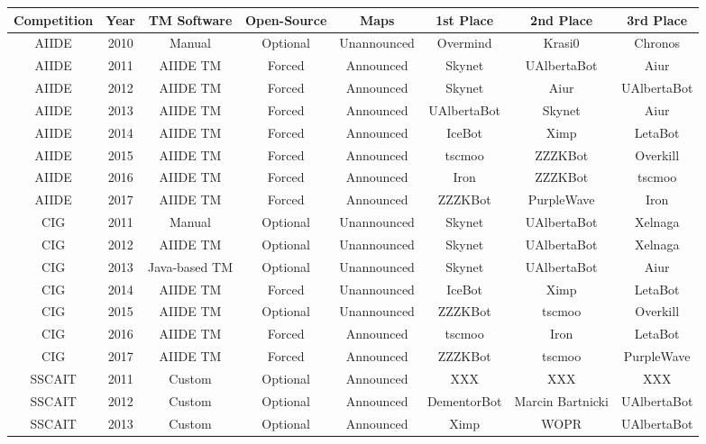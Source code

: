 
\begin{table}[t] 
 
 \begin{center}
 \begin{tabular} {| c | c | c c c | c c c |}
 \hline
 Competition & Year & TM Software & Open-Source & Maps & 1st Place & 2nd Place & 3rd Place\\
 \hline
 AIIDE & 2010 & Manual & Optional & Unannounced & Overmind & Krasi0 & Chronos \\
 \hline
 AIIDE & 2011 & AIIDE TM & Forced & Announced & Skynet & UAlbertaBot & Aiur \\
 \hline
 AIIDE & 2012 & AIIDE TM & Forced & Announced & Skynet & Aiur & UAlbertaBot\\
\hline
 AIIDE & 2013 & AIIDE TM & Forced & Announced & UAlbertaBot & Skynet & Aiur\\
\hline
 AIIDE & 2014 & AIIDE TM & Forced & Announced & IceBot & Ximp & LetaBot\\
\hline
 AIIDE & 2015 & AIIDE TM & Forced & Announced & tscmoo & ZZZKBot & Overkill\\
\hline
 AIIDE & 2016 & AIIDE TM & Forced & Announced & Iron & ZZZKBot & tscmoo\\
\hline
 AIIDE & 2017 & AIIDE TM & Forced & Announced & ZZZKBot & PurpleWave & Iron\\
\hline
 CIG & 2011 & Manual & Optional & Unannounced & Skynet & UAlbertaBot & Xelnaga\\
 \hline
 CIG & 2012 & AIIDE TM & Optional & Unannounced & Skynet & UAlbertaBot & Xelnaga\\
 \hline
 CIG & 2013 & Java-based TM & Optional & Unannounced & Skynet & UAlbertaBot & Aiur\\
 \hline
 CIG & 2014 & AIIDE TM & Forced & Unannounced & IceBot & Ximp & LetaBot\\
 \hline
 CIG & 2015 & AIIDE TM & Optional & Unannounced & ZZZKBot & tscmoo & Overkill\\
 \hline
 CIG & 2016 & AIIDE TM & Forced & Announced & tscmoo & Iron & LetaBot\\ 
 \hline
 CIG & 2017 & AIIDE TM & Forced & Announced & ZZZKBot & tscmoo & PurpleWave\\ 
 \hline   
 SSCAIT & 2011 & Custom & Optional & Announced & XXX & XXX & XXX\\
 \hline
 SSCAIT & 2012 & Custom & Optional & Announced & DementorBot & Marcin Bartnicki & UAlbertaBot\\
 \hline
 SSCAIT & 2013 & Custom & Optional & Announced & Ximp & WOPR & UAlbertaBot \\

\end{tabular}
\end{center}
\end{table}
